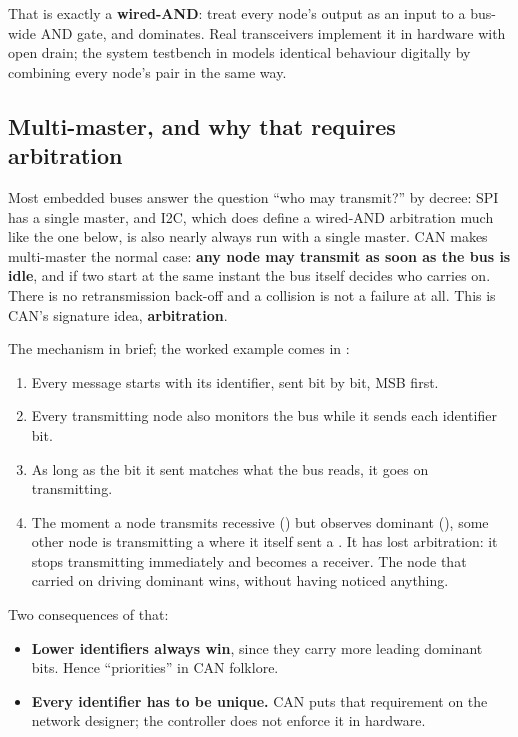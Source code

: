 That is exactly a \textbf{wired-AND}: treat every node's output as an input to a bus-wide AND gate,
and  dominates. Real transceivers implement it in hardware with open drain; the system
testbench in  models identical behaviour digitally by combining every node's pair
 in the same way.

\subsection*{Multi-master, and why that requires arbitration}
Most embedded buses answer the question ``who may transmit?'' by decree: SPI has a single master,
and I2C, which does define a wired-AND arbitration much like the one below, is also nearly always
run with a single master. CAN makes multi-master the normal case: \textbf{any node may transmit as
soon as the bus is idle}, and if two start at the same instant the bus itself decides who carries
on. There is no retransmission back-off and a collision is not a failure at all. This is CAN's
signature idea, \textbf{arbitration}.

The mechanism in brief; the worked example comes in :
\begin{enumerate}
  \item Every message starts with its identifier, sent bit by bit, MSB first.
  \item Every transmitting node also monitors the bus while it sends each identifier bit.
  \item As long as the bit it sent matches what the bus reads, it goes on transmitting.
  \item The moment a node transmits recessive () but observes dominant (), some
    other node is transmitting a  where it itself sent a . It has lost arbitration:
    it stops transmitting immediately and becomes a receiver. The node that carried on driving
    dominant wins, without having noticed anything.
\end{enumerate}

Two consequences of that:
\begin{itemize}
  \item \textbf{Lower identifiers always win}, since they carry more leading dominant bits. Hence
    ``priorities'' in CAN folklore.
  \item \textbf{Every identifier has to be unique.} CAN puts that requirement on the network
    designer; the controller does not enforce it in hardware.
\end{itemize}

